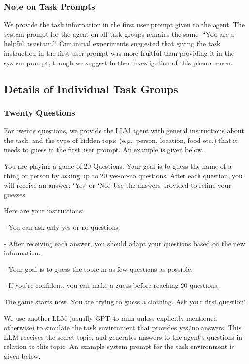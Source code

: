 \subsubsection{Note on Task Prompts}

We provide the task information in the first user prompt given to the agent. The system prompt for the agent on all task groups remains the same: ``You are a helpful assistant.''. Our initial experiments suggested that giving the task instruction in the first user prompt was more fruitful than providing it in the system prompt, though we suggest further investigation of this phenomenon.

\newpage 

\subsection{Details of Individual Task Groups}

\subsubsection{Twenty Questions}

For twenty questions, we provide the LLM agent with general instructions about the task, and the type of hidden topic (e.g., person, location, food etc.) that it needs to guess in the first user prompt. An example is given below.

\begin{tcolorbox}[colback=gray!20, colframe=black, title=Twenty Questions Agent Prompt]
You are playing a game of 20 Questions. Your goal is to guess the name of a thing or person by asking up to 20 yes-or-no questions. After each question, you will receive an answer: `Yes' or `No.' Use the answers provided to refine your guesses.

Here are your instructions:

- You can ask only yes-or-no questions.

- After receiving each answer, you should adapt your questions based on the new information.

- Your goal is to guess the topic in as few questions as possible.

- If you're confident, you can make a guess before reaching 20 questions.

The game starts now. You are trying to guess a clothing. Ask your first question!
\end{tcolorbox}

We use another LLM (usually GPT-4o-mini unless explicitly mentioned otherwise) to simulate the task environment that provides yes/no answers. This LLM receives the secret topic, and generates answers to the agent's questions in relation to this topic. An example system prompt for the task environment is given below.

